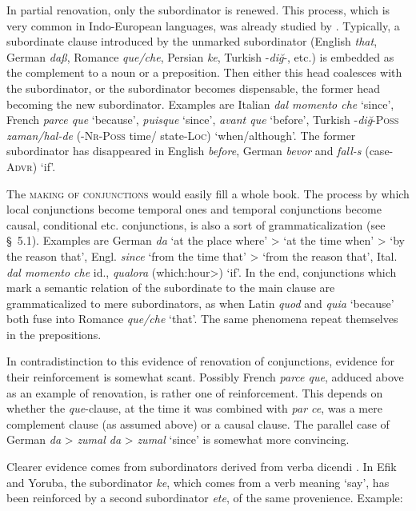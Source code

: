 In partial renovation, only the subordinator is renewed. This process, which is very common in Indo-European languages, was already studied by \citet{Meillet1915}. Typically, a subordinate clause introduced by the unmarked subordinator (English \textit{that}, German \textit{daß}, Romance \textit{que/che}, Persian \textit{ke}, Turkish -\textit{diğ}{}-, etc.) is embedded as the complement to a noun or a preposition. Then either this head coalesces with the subordinator, or the subordinator becomes dispensable, the former head becoming the new subordinator. Examples are Italian \textit{dal momento che} ‘since’, French \textit{parce que} ‘because’, \textit{puisque} ‘since’, \textit{avant que} ‘before’, Turkish -\textit{diğ}{}-\textsc{Poss} \textit{zaman/hal-de} (-\textsc{Nr-Poss} time/ state-\textsc{Loc}) ‘when/although’. The former subordinator has disappeared in English \textit{before}, German \textit{bevor} and \textit{fall-s} (case-\textsc{Advr}) ‘if’.

The \textsc{making of conjunctions} would easily fill a whole book. The process by which local conjunctions become temporal ones and temporal conjunctions become causal, conditional etc. conjunctions, is also a sort of grammaticalization (see §~5.1). Examples are German \textit{da} ‘at the place where’ {\textgreater} ‘at the time when’ {\textgreater} ‘by the reason that’, Engl. \textit{since} ‘from the time that’ {\textgreater} ‘from the reason that’, Ital. \textit{dal momento che} id., \textit{qualora} (which:hour{\textgreater}) ‘if’.\label{page70} In the end, conjunctions which mark a semantic relation of the subordinate to the main clause are grammaticalized to mere subordinators, as when Latin \textit{quod} and \textit{quia} ‘because’ both fuse into Romance \textit{que/che} ‘that’. The same phenomena repeat themselves in the prepositions.

In contradistinction to this evidence of renovation of conjunctions, evidence for their reinforcement is somewhat scant. Possibly French \textit{parce que}, adduced above as an example of renovation, is rather one of reinforcement. This depends on whether the \textit{que}{}-clause, at the time it was combined with \textit{par ce}, was a mere complement clause (as assumed above) or a causal clause. The parallel case of German \textit{da} {\textgreater} \textit{zumal da} {\textgreater} \textit{zumal} ‘since’ is somewhat more convincing.

Clearer evidence comes from subordinators derived from verba dicendi \citep[183]{Lord1976}. In Efik and Yoruba, the subordinator \textit{ke}, which comes from a verb meaning ‘say’, has been reinforced by a second subordinator \textit{ete}, of the same provenience. Example:

